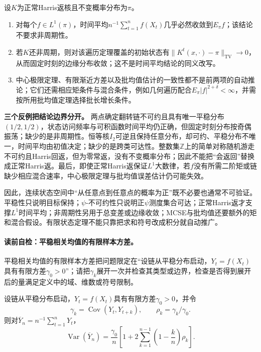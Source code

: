 \begin{proposition}[一般状态空间结论的条件分层]\label{prop:V5-C03-general-convergence}
设$K$为正常Harris返核且不变概率分布为$\pi$。
\begin{enumerate}[leftmargin=2.2em]
  \item 对每个$f\in L^1(\pi)$，时间平均$n^{-1}\sum_{t=1}^nf(X_t)$几乎必然收敛到$E_\pi f$；该结论不要求非周期性。
  \item 若$K$还非周期，则对该遍历定理覆盖的初始状态有$\lVert K^t(x,\cdot)-\pi\rVert_{\mathrm{TV}}\to0$，从而固定时刻的边缘分布收敛；这不是时间平均结论的同义改写。
  \item 中心极限定理、有限渐近方差以及批均值估计的一致性都不是前两项的自动推论；它们还需相应矩条件与混合条件，例如几何遍历配合$E_\pi|f|^{2+\delta}<\infty$，并需按所用批均值定理选择批长增长条件。
\end{enumerate}
\end{proposition}

\begin{comparisonbox}
\textbf{三个反例把结论边界分开。}
两点确定翻转链不可约且具有唯一平稳分布$(1/2,1/2)$，状态访问频率与可积函数时间平均仍正确，但固定时刻分布按奇偶振荡；缺少的是非周期性。恒等核$I_2$可逆且保持任意分布，却可约、平稳分布不唯一，时间平均由初值决定；缺少的是跨类可达性。整数集$\mathbb Z$上的简单对称随机游走不可约且Harris回返，但为零常返，没有不变概率分布；因此不能把“会返回”替换成正常Harris返。最后，即使正常Harris返保证$L^1$大数律，若$f$没有所需二阶矩或链缺少相应混合速率，中心极限定理与批均值误差估计仍可能失效。
\end{comparisonbox}

因此，连续状态空间中“从任意点到任意点的概率为正”既不必要也通常不可验证。平稳性只说明目标保持；$\psi$-不可约性只说明正$\psi$测度集合可达；正常Harris返才支撑$L^1$时间平均；非周期性另用于总变差或边缘收敛；MCSE与批均值还要额外的矩和混合假设。有限状态定理不能只靠把求和符号改成积分就自动推广。

\paragraph{读前自检：平稳相关均值的有限样本方差。}平稳相关均值的有限样本方差把问题限定在“设链从平稳分布启动，$Y_t=f(X_t)$具有有限方差$\gamma_0>0$”；请把$\gamma_k$展开一次并检查其类型或边界，检查是否得到展开后的量满足定义中的域、维数或符号限制。\par

\begin{proposition}[平稳相关均值的有限样本方差]\label{prop:V5-C03-correlated-variance}
设链从平稳分布启动，$Y_t=f(X_t)$具有有限方差$\gamma_0>0$，并令
\[
\gamma_k=\operatorname{Cov}(Y_t,Y_{t+k}),
\qquad \rho_k=\gamma_k/\gamma_0.
\]
则对$\overline Y_n=n^{-1}\sum_{t=1}^nY_t$，
\begin{equation}\label{eq:V5-C03-finite-variance}
\operatorname{Var}(\overline Y_n)
=\frac{\gamma_0}{n}
\left[
1+2\sum_{k=1}^{n-1}
\left(1-\frac{k}{n}\right)\rho_k
\right].
\end{equation}
\end{proposition}
